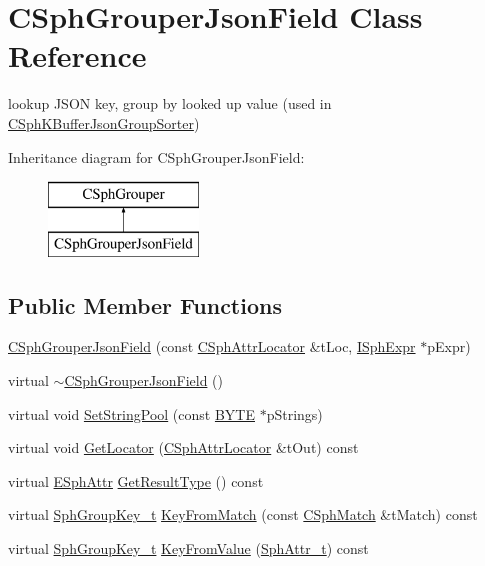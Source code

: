 \hypertarget{classCSphGrouperJsonField}{\section{C\-Sph\-Grouper\-Json\-Field Class Reference}
\label{classCSphGrouperJsonField}
}


lookup J\-S\-O\-N key, group by looked up value (used in \hyperlink{classCSphKBufferJsonGroupSorter}{C\-Sph\-K\-Buffer\-Json\-Group\-Sorter})  


Inheritance diagram for C\-Sph\-Grouper\-Json\-Field\-:\begin{figure}[H]
\begin{center}
\leavevmode
\includegraphics[height=2.000000cm]{classCSphGrouperJsonField}
\end{center}
\end{figure}
\subsection*{Public Member Functions}
\begin{DoxyCompactItemize}
\item 
\hyperlink{classCSphGrouperJsonField_ad8d52bf0a709019fb491e635baffad08}{C\-Sph\-Grouper\-Json\-Field} (const \hyperlink{structCSphAttrLocator}{C\-Sph\-Attr\-Locator} \&t\-Loc, \hyperlink{structISphExpr}{I\-Sph\-Expr} $\ast$p\-Expr)
\item 
virtual \hyperlink{classCSphGrouperJsonField_a591a59b7efe032b8c881606de742086c}{$\sim$\-C\-Sph\-Grouper\-Json\-Field} ()
\item 
virtual void \hyperlink{classCSphGrouperJsonField_a2d42b8785aec23839275f81110386831}{Set\-String\-Pool} (const \hyperlink{sphinxstd_8h_a4ae1dab0fb4b072a66584546209e7d58}{B\-Y\-T\-E} $\ast$p\-Strings)
\item 
virtual void \hyperlink{classCSphGrouperJsonField_a769c6af00495e16302dbc49e7c1a386f}{Get\-Locator} (\hyperlink{structCSphAttrLocator}{C\-Sph\-Attr\-Locator} \&t\-Out) const 
\item 
virtual \hyperlink{sphinxexpr_8h_aa883df0db2e4468a107fdd2d2ae625a3}{E\-Sph\-Attr} \hyperlink{classCSphGrouperJsonField_ad5258987efba7c864ce74ceb18390318}{Get\-Result\-Type} () const 
\item 
virtual \hyperlink{sphinxsort_8cpp_ab18dbc744a7e1518a776845191f194c8}{Sph\-Group\-Key\-\_\-t} \hyperlink{classCSphGrouperJsonField_afc180d801b6a72b52ab137f71e47e3c8}{Key\-From\-Match} (const \hyperlink{classCSphMatch}{C\-Sph\-Match} \&t\-Match) const 
\item 
virtual \hyperlink{sphinxsort_8cpp_ab18dbc744a7e1518a776845191f194c8}{Sph\-Group\-Key\-\_\-t} \hyperlink{classCSphGrouperJsonField_aa93be62a4281f05ee32faec9c0828df3}{Key\-From\-Value} (\hyperlink{sphinx_8h_a7c122d91b0b52a0214ba176636bb1561}{Sph\-Attr\-\_\-t}) const 
\end{DoxyCompactItemize}

